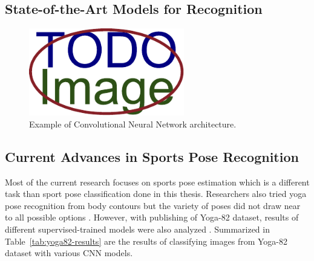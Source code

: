 \subsection{State-of-the-Art Models for Recognition}

\blindtext




\begin{figure}[ht]\centering
    \centering
    \includegraphics[width=\linewidth,height=1.5in]{figures/placeholder.pdf}
    \caption{Example of Convolutional Neural Network architecture.}
    \label{fig:cnn-example}
\end{figure}

\blindtext

\blindtext

\blindtext

\blindtext

\subsection{Current Advances in Sports Pose Recognition}

Most of the current research focuses on sports pose estimation which is a different task than sport pose classification done in this thesis. Researchers also tried yoga pose recognition from body contours but the variety of poses did not draw near to all possible options \cite{yoga-posture-recognition}. However, with publishing of Yoga-82 dataset, results of different supervised-trained models were also analyzed \cite{verma2020yoga}. Summarized in Table~\ref{tab:yoga82-results} are the results of classifying images from Yoga-82 dataset with various CNN models.


